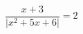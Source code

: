 \begin{ex}[type=equation]
	\begin{condition}
		$\dfrac{x+3}{\big|x^2 + 5x + 6\big|} = 2$
	\end{condition}
\end{ex}